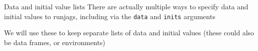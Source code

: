 \documentclass[
  ignorenonframetext,
]{beamer}
\newenvironment{Shaded}{\begin{snugshade}}{\end{snugshade}}
\newcommand{\AttributeTok}[1]{\textcolor[rgb]{0.13,0.29,0.53}{#1}}
\newcommand{\ConstantTok}[1]{\textcolor[rgb]{0.56,0.35,0.01}{#1}}
\newcommand{\DecValTok}[1]{\textcolor[rgb]{0.00,0.00,0.81}{#1}}
\newcommand{\FunctionTok}[1]{\textcolor[rgb]{0.13,0.29,0.53}{\textbf{#1}}}
\newcommand{\NormalTok}[1]{#1}
\newcommand{\OtherTok}[1]{\textcolor[rgb]{0.56,0.35,0.01}{#1}}
\newcommand{\SpecialCharTok}[1]{\textcolor[rgb]{0.81,0.36,0.00}{\textbf{#1}}}
\begin{document}
\begin{frame}[fragile]
\begin{block}{Data and initial value lists}
\protect\hypertarget{data-and-initial-value-lists}{}
There are actually multiple ways to specify data and initial values to
runjags, including via the \texttt{data} and \texttt{inits} arguments

We will use these to keep separate lists of data and initial values
(these could also be data frames, or environments)

\scriptsize

\begin{Shaded}
\end{Shaded}

\normalsize
\end{block}
\end{frame}
\end{document}
